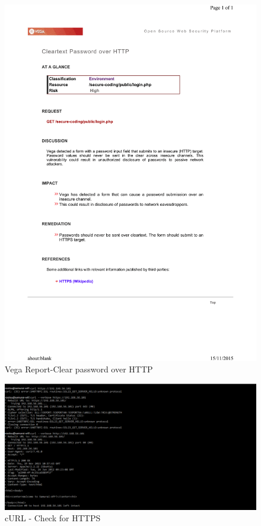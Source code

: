 \begin{figure}[ht]
	\centering
		\includegraphics[width=.8\linewidth]{figures/OTG-AUTHN-001_1.png}
		\caption{Vega Report-Clear password over HTTP}
	\label{fig:password_over_http}
\end{figure}
\begin{figure}[ht]
	\centering
		\includegraphics[width=.8\linewidth]{figures/OTG-AUTHN-001_2.png}
		\caption{cURL - Check for HTTPS}
	\label{fig:curl_https}
\end{figure}

